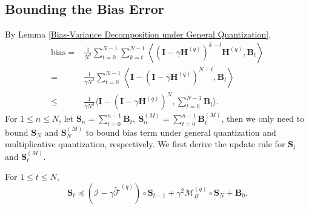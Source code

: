 \documentclass[11pt, letterpaper]{article}
\begin{document}
\subsection{Bounding the Bias Error}
\label{Bounding the Bias Error}
By Lemma \ref{Bias-Variance Decomposition under General Quantization},
\begin{equation}
\label{bias express}
    \begin{aligned}
        \mathrm{bias}=&\frac{1}{N^{2}}\sum_{t=0}^{N-1}\sum_{k=t}^{N-1}\left\langle(\mathbf{I}-\gamma\mathbf{H}^{(q)})^{k-t}\mathbf{H}^{(q)},\mathbf{B}_{t}\right\rangle \\
        =&\frac{1}{\gamma N^{2}}\sum_{t=0}^{N-1}\left\langle\mathbf{I}-(\mathbf{I}-\gamma\mathbf{H}^{(q)})^{N-t},\mathbf{B}_{t}\right\rangle \\
        \leq&\frac{1}{\gamma N^{2}}\langle\mathbf{I}-(\mathbf{I}-\gamma\mathbf{H}^{(q)})^{N},\sum_{t=0}^{N-1}\mathbf{B}_{t}\rangle.
    \end{aligned}
\end{equation}
For $1 \leq n\leq N$, let $\mathbf{S}_n=\sum_{t=0}^{n-1}\mathbf{B}_t,\ \mathbf{S}_n^{(M)}=\sum_{t=0}^{n-1}\mathbf{B}_t^{(M)}$, then we only need to bound $\mathbf{S}_N$ and $\mathbf{S}_N^{(M)}$ to bound bias term under general quantization and multiplicative quantization, respectively. We first derive the update rule for $\mathbf{S}_t$ and $\mathbf{S}_t^{(M)}$.
\begin{lemma}
\label{(Initial Study of $S_t$)}
    For $1 \leq t\leq N$,
    \begin{equation*}
        \mathbf{S}_t \preceq (\mathcal{I}-\gamma\tilde{\mathcal{T}}^{(q)})\circ\mathbf{S}_{t-1}+\gamma^{2}\mathcal{M}_B^{(q)}\circ\mathbf{S}_{N}+\mathbf{B}_{0}.
    \end{equation*}
\end{lemma}
\end{document}

